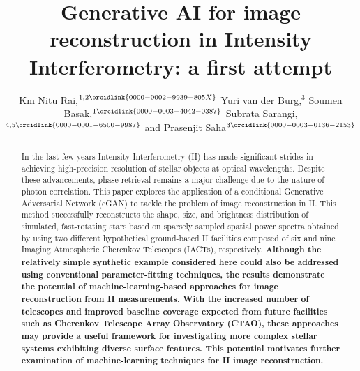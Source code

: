 \documentclass[twocolumn]{openjournal}
\begin{document}
\title{Generative AI for image reconstruction in Intensity Interferometry: a first attempt}
\date{}

\author{Km Nitu Rai,$^{1,2\orcidlink{0000-0002-9939-805X}}$ Yuri van der Burg,$^{3}$ Soumen Basak,$^{1\orcidlink{0000-0003-4042-0387}}$	Subrata Sarangi,$^{4,5\orcidlink{0000-0001-6500-9987}}$	and Prasenjit Saha$^{3\orcidlink{0000-0003-0136-2153}}$}






\begin{abstract}
	In the last few years Intensity Interferometry (II) has made significant strides in achieving high-precision resolution of stellar objects at optical wavelengths. Despite these advancements, phase retrieval remains a major challenge due to the nature of photon correlation. This paper explores the application of a conditional Generative Adversarial Network (cGAN) to tackle the problem of image reconstruction in II. This method successfully reconstructs the shape, size, and brightness distribution of simulated, fast-rotating stars based on sparsely sampled spatial power spectra obtained by using two different hypothetical ground-based II facilities composed of six and nine Imaging Atmospheric Cherenkov Telescopes (IACTs), respectively. {\bf Although the relatively simple synthetic example considered here could also be addressed using conventional parameter-fitting techniques, the results demonstrate the potential of machine-learning-based approaches for image reconstruction from II measurements. With the increased number of telescopes and improved baseline coverage expected from future facilities such as Cherenkov Telescope Array Observatory (CTAO), these approaches may provide a useful framework for investigating more complex stellar systems exhibiting diverse surface features. This potential motivates further examination of machine-learning techniques for II image reconstruction.}
\end{abstract}
\end{document}
